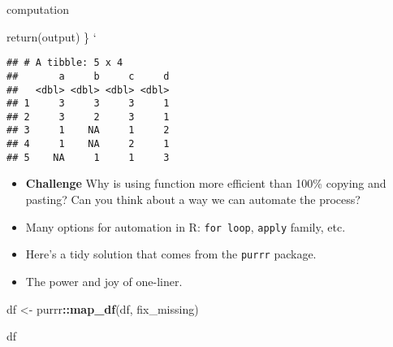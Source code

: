 \documentclass[
]{book}
\newenvironment{Shaded}{\begin{snugshade}}{\end{snugshade}}
\newcommand{\CommentTok}[1]{\textcolor[rgb]{0.56,0.35,0.01}{\textit{#1}}}
\newcommand{\ControlFlowTok}[1]{\textcolor[rgb]{0.13,0.29,0.53}{\textbf{#1}}}
\newcommand{\DecValTok}[1]{\textcolor[rgb]{0.00,0.00,0.81}{#1}}
\newcommand{\KeywordTok}[1]{\textcolor[rgb]{0.13,0.29,0.53}{\textbf{#1}}}
\newcommand{\NormalTok}[1]{#1}
\newcommand{\OperatorTok}[1]{\textcolor[rgb]{0.81,0.36,0.00}{\textbf{#1}}}
\newcommand{\OtherTok}[1]{\textcolor[rgb]{0.56,0.35,0.01}{#1}}
\newcommand{\StringTok}[1]{\textcolor[rgb]{0.31,0.60,0.02}{#1}}
\begin{document}
computation

return(output)
\}
`

\begin{Shaded}
\end{Shaded}

\begin{verbatim}
## # A tibble: 5 x 4
##       a     b     c     d
##   <dbl> <dbl> <dbl> <dbl>
## 1     3     3     3     1
## 2     3     2     3     1
## 3     1    NA     1     2
## 4     1    NA     2     1
## 5    NA     1     1     3
\end{verbatim}

\begin{itemize}
\item
  \textbf{Challenge} Why is using function more efficient than 100\% copying and pasting? Can you think about a way we can automate the process?
\item
  Many options for automation in R: \texttt{for\ loop}, \texttt{apply} family, etc.
\item
  Here's a tidy solution that comes from the \texttt{purrr} package.
\item
  The power and joy of one-liner.
\end{itemize}

\begin{Shaded}
\begin{Highlighting}[]
\NormalTok{df \textless{}{-}}\StringTok{ }\NormalTok{purrr}\OperatorTok{::}\KeywordTok{map\_df}\NormalTok{(df, fix\_missing)}

\NormalTok{df}
\end{Highlighting}
\end{Shaded}
\end{document}
